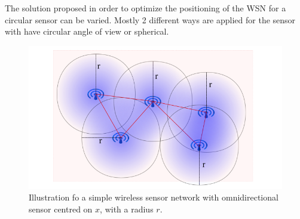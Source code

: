 The solution proposed in order to optimize the positioning of the WSN for a circular sensor can be varied. Mostly 2 different ways are applied for the sensor with have circular angle of view or spherical.\\
\begin{figure}[t!]
	\center
{}
   \includegraphics[width=\linewidth]{img/sensorWSN3.png}
  \caption{ Illustration fo a  simple wireless sensor network with omnidirectional sensor centred on $x$, with a radius $r$.}\label{fig:WsnSensorNet}
  \endminipage\hfill
\end{figure}
